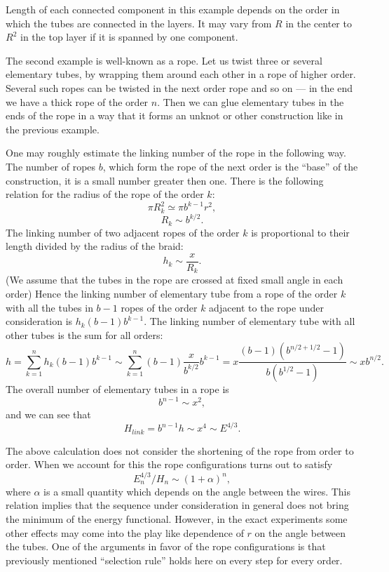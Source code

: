 \documentclass[a4paper,12pt]{article}
\begin{document}
	Length of each connected component in this example depends
	on the order in which the tubes are connected in the layers.
	It may vary from 
    $ R $ 
	in the center to 
    $ R^{2} $
	in the top layer if it is spanned by one component.

	The second example is well-known as a rope.
        Let us twist three or several elementary tubes, by wrapping 
        them around each other in a rope of higher order. 
	Several such ropes can be twisted 
        in the next order rope and so on --- in the end we have a thick rope
        of the order 
    $ n $. 
	Then we can glue elementary tubes in the ends 
        of the rope in a way that it forms an unknot or other construction
	like in the previous example.

        One may roughly estimate the linking number of the rope in
        the following way.
        The number of ropes $ b $, which form the rope of the next order 
        is the ``base'' of the construction, it is a small number
	greater then one. 
	There is the following relation for the radius of the rope of the
        order $ k$:
$$ \pi R^{2}_{k} \simeq \pi b^{k-1} r^{2} ,$$
$$ R_{k} \sim b^{k/2} .$$
        The linking number of two adjacent ropes of the order $ k$ 
        is proportional to their length divided by the radius 
        of the braid:
$$ h_{k} \sim \frac{x}{R_{k}} .$$
        (We assume that the tubes in the rope are crossed at fixed small angle
        in each order) 
        Hence the linking number of elementary tube from a rope of the
        order $ k$ with all the tubes in $ b-1 $ ropes
        of the order $ k $ adjacent to the rope under consideration is 
    $ h_{k} (b-1) b^{k-1} $. 
	The linking number of elementary
        tube with all other tubes is the sum for all orders:
$$ h = \sum^{n}_{k=1} h_{k} (b-1) b^{k-1} \sim
        \sum^{n}_{k=1} (b-1) \frac{x}{b^{k/2}} b^{k-1}
        = x \frac{ (b-1) (b^{n/2+1/2} -1)}{b(b^{1/2} -1)} \sim x b^{n/2}. $$
        The overall number of elementary tubes in a rope is
$$ b^{n-1} \sim x^{2}, $$
        and we can see that
$$ H_{link} = b^{n-1} h \sim x^{4} \sim E^{4/3} .$$

	The above calculation does not consider the shortening
	of the rope from order to order. When we account for this
	the rope configurations turns out to satisfy
\begin{equation}
    E^{4/3}_{n} / H_{n} \sim (1 + \alpha)^{n} ,
\end{equation}
	where 
    $ \alpha $
	is a small quantity which depends on the angle between the wires.
	This relation implies that the sequence under consideration 
	in general does not bring the minimum of the energy functional.
	However, in the exact experiments some other effects may come
	into the play like dependence of
    $ r $
	on the angle between the tubes.
	One of the arguments in favor of the rope configurations
	is that previously mentioned ``selection rule'' holds here on every
	step for every order.
\end{document}

